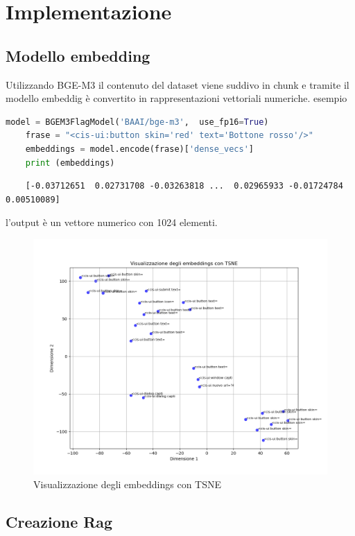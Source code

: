 \documentclass[12pt,a4paper,openright,twoside]{book}
\begin{document}
\section{Implementazione}
\subsection{Modello embedding}
Utilizzando BGE-M3 il contenuto del dataset viene suddivo in chunk e tramite il modello embeddig è convertito in rappresentazioni vettoriali numeriche.
esempio
\begin{lstlisting}[language=Python]
    model = BGEM3FlagModel('BAAI/bge-m3',  use_fp16=True)
    frase = "<cis-ui:button skin='red' text='Bottone rosso'/>"
    embeddings = model.encode(frase)['dense_vecs']
    print (embeddings)
\end{lstlisting}
\begin{verbatim}
    [-0.03712651  0.02731708 -0.03263818 ...  0.02965933 -0.01724784  0.00510089]
\end{verbatim}
l'output è un vettore numerico con 1024 elementi.

\begin{figure}[h]
    \centering
    \includegraphics[width=\textwidth]{figures/vis_embeddings_TSE.png}
    \caption{Visualizzazione degli embeddings con TSNE}
    \label{fig:vis_embeddings_tsne}
\end{figure}

\subsection{Creazione Rag}
\end{document}
